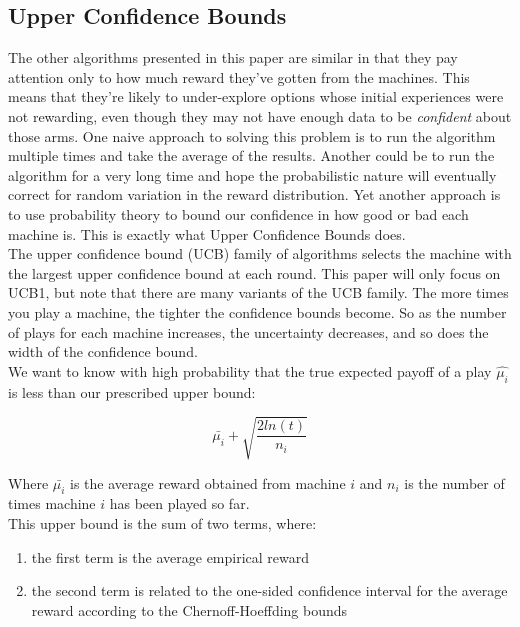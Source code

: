 \documentclass{article}
\begin{document}
\subsection{Upper Confidence Bounds}

The other algorithms presented in this paper are similar in that they pay attention only to how much reward they've gotten from the machines. This means that they're likely to under-explore options whose initial experiences were not rewarding, even though they may not have enough data to be \textit{confident} about those arms. One naive approach to solving this problem is to run the algorithm multiple times and take the average of the results. Another could be to run the algorithm for a very long time and hope the probabilistic nature will eventually correct for random variation in the reward distribution. Yet another approach is to use probability theory to bound our confidence in how good or bad each machine is. This is exactly what Upper Confidence Bounds does.\\

The upper confidence bound (UCB) family of algorithms selects the machine with the largest upper confidence bound at each round. This paper will only focus on UCB1, but note that there are many variants of the UCB family. The more times you play a machine, the tighter the confidence bounds become. So as the number of plays for each machine increases, the uncertainty decreases, and so does the width of the confidence bound.\\

We want to know with high probability that the true expected payoff of a play $\hat{\mu_i}$ is less than our prescribed upper bound:

$$\bar{\mu_{i}} + \sqrt{\frac{2 ln (t)}{n_i}}$$

Where $\bar{\mu_{i}}$ is the average reward obtained from machine $i$ and $n_i$ is the number of times machine $i$ has been played so far.\\

This upper bound is the sum of two terms, where:

\begin{enumerate}
\item the first term is the average empirical reward
\item the second term is related to the one-sided confidence interval for the average reward according to the Chernoff-Hoeffding bounds
\end{enumerate}
\end{document}
